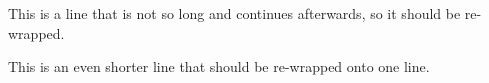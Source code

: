 \documentclass{article}
\begin{document}
This is a line that is not so long and continues afterwards, so it
should be re-wrapped.

This is an even shorter line that should be re-wrapped onto one line.
\end{document}
